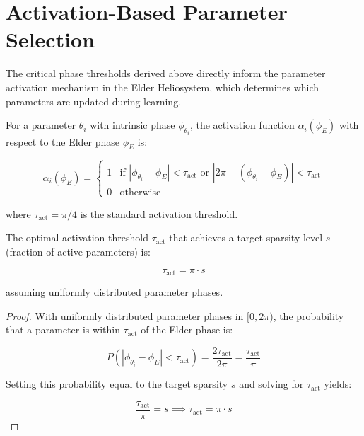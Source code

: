 \section{Activation-Based Parameter Selection}

The critical phase thresholds derived above directly inform the parameter activation mechanism in the Elder Heliosystem, which determines which parameters are updated during learning.

\begin{definition}
For a parameter $\theta_i$ with intrinsic phase $\phi_{\theta_i}$, the activation function $\alpha_i(\phi_E)$ with respect to the Elder phase $\phi_E$ is:

\begin{equation}
\alpha_i(\phi_E) = 
\begin{cases}
1 & \text{if } |\phi_{\theta_i} - \phi_E| < \tau_{\text{act}} \text{ or } |2\pi - (\phi_{\theta_i} - \phi_E)| < \tau_{\text{act}} \\
0 & \text{otherwise}
\end{cases}
\end{equation}

where $\tau_{\text{act}} = \pi/4$ is the standard activation threshold.
\end{definition}

\begin{theorem}
The optimal activation threshold $\tau_{\text{act}}$ that achieves a target sparsity level $s$ (fraction of active parameters) is:

\begin{equation}
\tau_{\text{act}} = \pi \cdot s
\end{equation}

assuming uniformly distributed parameter phases.
\end{theorem}

\begin{proof}
With uniformly distributed parameter phases in $[0, 2\pi)$, the probability that a parameter is within $\tau_{\text{act}}$ of the Elder phase is:

\begin{equation}
P(|\phi_{\theta_i} - \phi_E| < \tau_{\text{act}}) = \frac{2\tau_{\text{act}}}{2\pi} = \frac{\tau_{\text{act}}}{\pi}
\end{equation}

Setting this probability equal to the target sparsity $s$ and solving for $\tau_{\text{act}}$ yields:

\begin{equation}
\frac{\tau_{\text{act}}}{\pi} = s \implies \tau_{\text{act}} = \pi \cdot s
\end{equation}
\end{proof}

